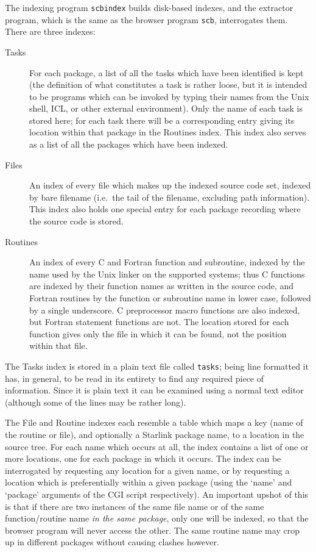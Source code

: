 \documentclass[twoside,11pt]{article}
\renewcommand{\_}{\texttt{\symbol{95}}}
\begin{document}
The indexing program {\tt scbindex} builds disk-based indexes, and the
extractor program, which is the same as the browser program  {\tt scb},
interrogates them.  There are three indexes:
\begin{description}
\item[Tasks]
For each package, a list of all the tasks which have been identified
is kept (the definition of what constitutes a task is rather
loose, but it is intended to be programs which can be invoked by
typing their names from the Unix shell, ICL, or other external
environment).
Only the name of each task is stored here;
for each task there will be a corresponding entry giving its location within
that package in the Routines index.
This index also serves as a list of all the
packages which have been indexed.
%
\item[Files]
An index of every file which makes up the indexed source code set,
indexed by bare filename (i.e.\ the tail of the filename, excluding
path information).
This index also holds one special entry for each package
recording where the source code is stored.
%
\item[Routines]
An index of every C and Fortran function and subroutine,
indexed by the name used by the Unix linker on the supported systems;
thus C functions are indexed by their function names
as written in the source code, and Fortran routines by the function
or subroutine name in lower case, followed by a single underscore.
C preprocessor macro functions are also indexed,
but Fortran statement functions are not.
The location stored for each function gives only the file in
which it can be found, not the position within that file.
\end{description}

The Tasks index is stored in a plain text file called {\tt tasks};
being line formatted it has, in general,
to be read in its entirety to find any
required piece of information.
Since it is plain text
it can be examined using a normal text editor
(although some of the lines may be rather long).

The File and Routine indexes
each resemble a table which
maps a key (name of the routine or file), and optionally a
Starlink package name, to a location in the source tree.
For each name which occurs at all,
the index contains a list of one or more locations,
one for each package in which it occurs.
The index can be interrogated by requesting any location for a given name,
or by requesting a location which is preferentially within a given package
(using the `name' and `package' arguments of the CGI script respectively).
An important upshot of this is that if there are two instances of
the same file name or of the same function/routine name
{\em in the same package\/}, only one will be indexed, so that the
browser program will never access the other.
The same routine name may crop up in different packages without causing
clashes however.
\end{document}
